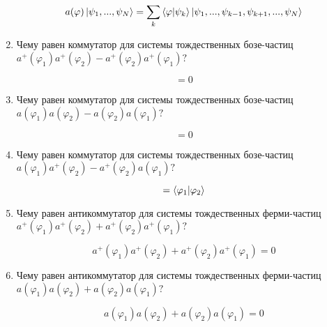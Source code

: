 \documentclass{article}
\begin{document}
\begin{enumerate}
	\begin{equation}
		a(\varphi)\ket{\psi_1, . . . , \psi_N} = \sum\limits_{k} \braket{\varphi|\psi_k} \ket{\psi_1,...,\psi_{k-1},\psi_{k+1},...,\psi_N}
	\end{equation}
	
	\item {Чему равен коммутатор для системы тождественных бозе-частиц \\$a^+(\varphi_1)a^+(\varphi_2) - a^+(\varphi_2)a^+(\varphi_1)?$}
	
	\begin{equation}
		[a^+(\varphi_1), a^+(\varphi_2)] = 0
	\end{equation}
	
	\item {Чему равен коммутатор для системы тождественных бозе-частиц \\$a(\varphi_1)a(\varphi_2) - a(\varphi_2)a(\varphi_1)?$}
	
	\begin{equation}
		[a(\varphi_1), a(\varphi_2)] = 0
	\end{equation}		
	
	\item {Чему равен коммутатор для системы тождественных бозе-частиц \\$a(\varphi_1)a^+(\varphi_2) - a^+(\varphi_2)a(\varphi_1)?$}
	
	\begin{equation}
		[a(\varphi_1), a^+(\varphi_2)] = \braket{\varphi_1|\varphi_2}
	\end{equation}
	
	\item {Чему равен антикоммутатор для системы тождественных ферми-частиц \\$a^+(\varphi_1)a^+(\varphi_2) + a^+(\varphi_2)a^+(\varphi_1)?$}
	
	\begin{equation}
		a^+(\varphi_1)a^+(\varphi_2) + a^+(\varphi_2)a^+(\varphi_1) = 0
	\end{equation}
	
	\item {Чему равен антикоммутатор для системы тождественных ферми-частиц \\$a(\varphi_1)a(\varphi_2) + a(\varphi_2)a(\varphi_1)?$}
	
	\begin{equation}
		a(\varphi_1)a(\varphi_2) + a(\varphi_2)a(\varphi_1) = 0
	\end{equation}
	

\end{enumerate}
\end{document}
